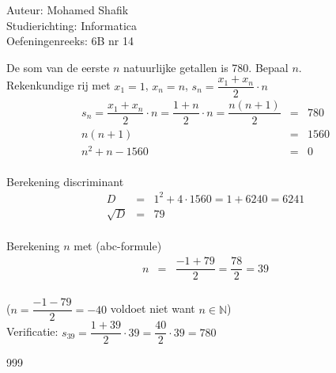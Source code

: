 \documentclass[a4paper]{article}
\begin{document}
\noindent \large Auteur: Mohamed Shafik \\
\noindent \large Studierichting: Informatica\\
\noindent \large Oefeningenreeks: 6B nr 14\\

\medskip

\normalsize

De som van de eerste $n$ natuurlijke getallen is 780. Bepaal $n$.\\

Rekenkundige rij met $x_1 = 1$, $x_n = n$, $s_n = \dfrac{x_1 + x_n}{2} \cdot n$\\

\begin{eqnarray*}
s_n = \dfrac{x_1 + x_n}{2} \cdot n = \dfrac{1 + n}{2} \cdot n = \dfrac{n(n+1)}{2} &=& 780\\
n(n+1) &=& 1560\\
n^2 + n - 1560 &=& 0\\
\end{eqnarray*}

Berekening discriminant\\

\begin{eqnarray*}
D &=& 1^2 + 4 \cdot 1560 = 1 + 6240 = 6241\\
\sqrt{D} &=& 79\\
\end{eqnarray*}

Berekening $n$ met (abc-formule)\\

\begin{eqnarray*}
n &=& \dfrac{-1 + 79}{2} = \dfrac{78}{2} = 39\\
\end{eqnarray*}

($n = \dfrac{-1 - 79}{2} = -40$ voldoet niet want $n \in \mathbb{N}$)\\

Verificatie: $s_{39} = \dfrac{1 + 39}{2} \cdot 39 = \dfrac{40}{2} \cdot 39 = 780$\\

\begin{thebibliography}{999}
\end{thebibliography}
\end{document}
